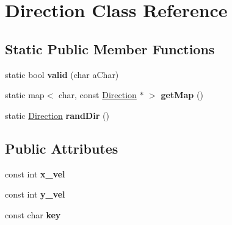 \hypertarget{class_direction}{}\section{Direction Class Reference}
\label{class_direction}
\subsection*{Static Public Member Functions}
\begin{DoxyCompactItemize}
\item 
\hypertarget{class_direction_ad79270b5e131f3d4f70ca71b5c478c77}{}\label{class_direction_ad79270b5e131f3d4f70ca71b5c478c77} 
static bool {\bfseries valid} (char a\+Char)
\item 
\hypertarget{class_direction_aeedf91220788eda4705c5c31e564b1dd}{}\label{class_direction_aeedf91220788eda4705c5c31e564b1dd} 
static map$<$ char, const \hyperlink{class_direction}{Direction} $\ast$ $>$ {\bfseries get\+Map} ()
\item 
\hypertarget{class_direction_a651d7934c9989757ba52ff636a18d478}{}\label{class_direction_a651d7934c9989757ba52ff636a18d478} 
static \hyperlink{class_direction}{Direction} {\bfseries rand\+Dir} ()
\end{DoxyCompactItemize}
\subsection*{Public Attributes}
\begin{DoxyCompactItemize}
\item 
\hypertarget{class_direction_ad1ddaa30789ac5c419014144b30ac7c9}{}\label{class_direction_ad1ddaa30789ac5c419014144b30ac7c9} 
const int {\bfseries x\+\_\+vel}
\item 
\hypertarget{class_direction_a4e06a7192a2abd4a84f2d7be556e5111}{}\label{class_direction_a4e06a7192a2abd4a84f2d7be556e5111} 
const int {\bfseries y\+\_\+vel}
\item 
\hypertarget{class_direction_a3a3618eec098a69b747637e53e02a8c4}{}\label{class_direction_a3a3618eec098a69b747637e53e02a8c4} 
const char {\bfseries key}
\end{DoxyCompactItemize}
